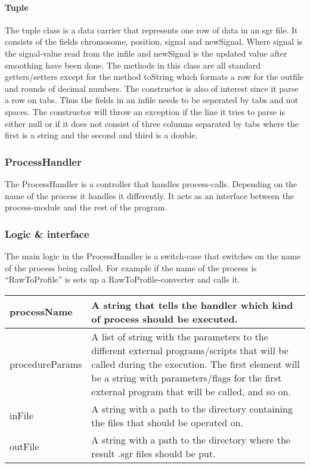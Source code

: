 \paragraph{Tuple}
The tuple class is a data carrier that represents one row of data in an sgr file. It consists of the fields chromosome, position, signal and newSignal. Where signal is the signal-value read from the infile and newSignal is the updated value after smoothing have been done.
The methods in this class are all standard getters/setters except for the method toString which formats a row for the outfile and rounds of decimal numbers. The constructor is also of interest since it parse a row on tabs. Thus the fields in an infile needs to be seperated by tabs and not spaces. The constructor will throw an exception if the line it tries to parse is either null or if it does not consist of three columns separated by tabs where the first is a string and the second and third is a double.


\subsubsection{ProcessHandler}
The ProcessHandler is a controller that handles process-calls. Depending on the name of the process it handles it differently. It acts as an interface between the process-module and the rest of the program. 


\subsubsection{Logic \& interface}
The main logic in the ProcessHandler is a switch-case that switches on the name of the process being called. For example if the name of the process is “RawToProfile” is sets up a RawToProfile-converter and calls it. 

\begin{tabular}{|l| p{7cm}|}
\hline
processName & A string that tells the handler which kind of process should be
executed. \\ \hline
procedureParams & A list of string with the parameters to the different external
programs/scripts that will be called during the execution. The first element
will be a string with parameters/flags for the first external program that will
be called, and so on. \\ \hline
inFile & A string with a path to the directory containing the files that should
be operated on. \\ \hline
outFile & A string with a path to the directory where the result .sgr files
should be put. \\ \hline
\end{tabular}




